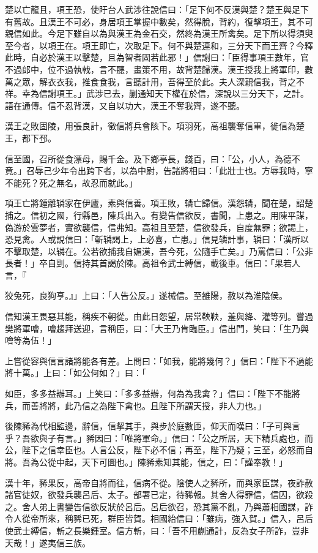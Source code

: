 \begin{pinyinscope}
楚以亡龍且，項王恐，使盱台人武涉往說信曰：「足下何不反漢與楚？楚王與足下有舊故。且漢王不可必，身居項王掌握中數矣，然得脫，背約，復擊項王，其不可親信如此。今足下雖自以為與漢王為金石交，然終為漢王所禽矣。足下所以得須臾至今者，以項王在。項王即亡，次取足下。何不與楚連和，三分天下而王齊？今釋此時，自必於漢王以擊楚，且為智者固若此邪！」信謝曰：「臣得事項王數年，官不過郎中，位不過執戟，言不聽，畫策不用，故背楚歸漢。漢王授我上將軍印，數萬之眾，解衣衣我，推食食我，言聽計用，吾得至於此。夫人深親信我，背之不祥。幸為信謝項王。」武涉已去，蒯通知天下權在於信，深說以三分天下，之計。語在通傳。信不忍背漢，又自以功大，漢王不奪我齊，遂不聽。

漢王之敗固陵，用張良計，徵信將兵會陔下。項羽死，高祖襲奪信軍，徙信為楚王，都下邳。

信至國，召所從食漂母，賜千金。及下鄉亭長，錢百，曰：「公，小人，為德不竟。」召辱己少年令出跨下者，以為中尉，告諸將相曰：「此壯士也。方辱我時，寧不能死？死之無名，故忍而就此。」

項王亡將鍾離辚家在伊廬，素與信善。項王敗，辚亡歸信。漢怨辚，聞在楚，詔楚捕之。信初之國，行縣邑，陳兵出入。有變告信欲反，書聞，上患之。用陳平謀，偽游於雲夢者，實欲襲信，信弗知。高祖且至楚，信欲發兵，自度無罪；欲謁上，恐見禽。人或說信曰：「斬辚謁上，上必喜，亡患。」信見辚計事，辚曰：「漢所以不擊取楚，以辚在。公若欲捕我自媚漢，吾今死，公隨手亡矣。」乃罵信曰：「公非長者！」卒自剄。信持其首謁於陳。高祖令武士縛信，載後車。信曰：「果若人言，『

狡兔死，良狗亨。』」上曰：「人告公反。」遂械信。至雒陽，赦以為淮陰侯。

信知漢王畏惡其能，稱疾不朝從。由此日怨望，居常鞅鞅，羞與絳、灌等列。嘗過樊將軍噲，噲趨拜送迎，言稱臣，曰：「大王乃肯臨臣。」信出門，笑曰：「生乃與噲等為伍！」

上嘗從容與信言諸將能各有差。上問曰：「如我，能將幾何？」信曰：「陛下不過能將十萬。」上曰：「如公何如？」曰：「

如臣，多多益辦耳。」上笑曰：「多多益辦，何為為我禽？」信曰：「陛下不能將兵，而善將將，此乃信之為陛下禽也。且陛下所謂天授，非人力也。」

後陳豨為代相監邊，辭信，信挈其手，與步於庭數匝，仰天而嘆曰：「子可與言乎？吾欲與子有言。」豨因曰：「唯將軍命。」信曰：「公之所居，天下精兵處也，而公，陛下之信幸臣也。人言公反，陛下必不信；再至，陛下乃疑；三至，必怒而自將。吾為公從中起，天下可圖也。」陳豨素知其能，信之，曰：「謹奉教！」

漢十年，豨果反，高帝自將而往，信病不從。陰使人之豨所，而與家臣謀，夜詐赦諸官徒奴，欲發兵襲呂后、太子。部署已定，待豨報。其舍人得罪信，信囚，欲殺之。舍人弟上書變告信欲反狀於呂后。呂后欲召，恐其黨不亂，乃與蕭相國謀，詐令人從帝所來，稱豨已死，群臣皆賀。相國紿信曰：「雖病，強入賀。」信入，呂后使武士縛信，斬之長樂鍾室。信方斬，曰：「吾不用蒯通計，反為女子所詐，豈非天哉！」遂夷信三族。


\end{pinyinscope}
